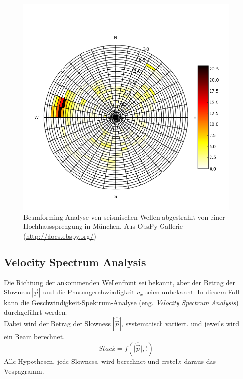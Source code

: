 \begin{figure}[h!]
\centering
\includegraphics[width=.7\tw]{fig/05-Stapelung/beamforming_fk_analysis.png}
\caption{Beamforming Analyse von seismischen Wellen abgestrahlt von einer Hochhaussprengung in München. Aus ObsPy Gallerie (\url{http://docs.obspy.org/})}
\end{figure}

\subsection{Velocity Spectrum Analysis}
Die Richtung der ankommenden Wellenfront sei bekannt, aber der Betrag der Slowness  $|\vec{p}|$ und die Phasengeschwindigkeit $c_x$ seien unbekannt.
In diesem Fall kann die Geschwindigkeit-Spektrum-Analyse (eng. \textsl{Velocity Spectrum Analysis}) durchgeführt werden.\\
Dabei wird der Betrag der Slowness $|\hat{\vec{p}}|$, systematisch variiert, und jeweils wird ein Beam berechnet.
\[
Stack = f(\vert\hat{\vec{p}}\vert,t)
\]
Alle Hypothesen, jede Slowness, wird berechnet und erstellt daraus das Vespagramm.

